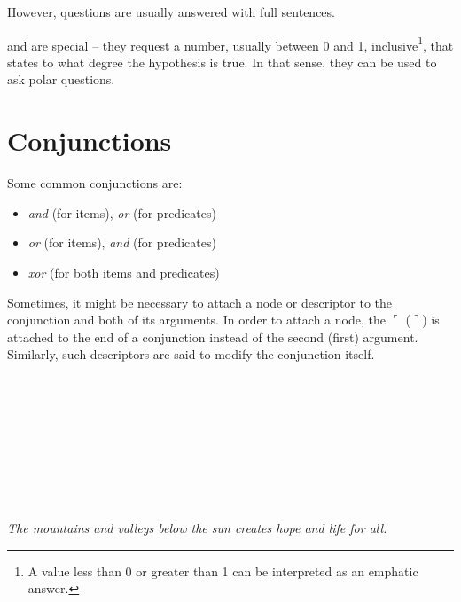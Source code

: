 \documentclass{book}
\begin{document}
However,  questions are usually answered with full sentences.

 and  are special -- they request a number, usually between 0 and 1, inclusive\footnote{A value less than 0 or greater than 1 can be interpreted as an emphatic answer.}, that states to what degree the hypothesis is true. In that sense, they can be used to ask polar questions.

\section{Conjunctions}


Some common conjunctions are:

\begin{itemize}
  \item {} \emph{and} (for items), \emph{or} (for predicates)
  \item {} \emph{or} (for items), \emph{and} (for predicates)
  \item {} \emph{xor} (for both items and predicates)
\end{itemize}

Sometimes, it might be necessary to attach a node or descriptor to the conjunction and both of its arguments. In order to attach a node, the $\ulcorner$ ($\urcorner$) is attached to the end of a conjunction instead of the second (first) argument. Similarly, such descriptors are said to modify the conjunction itself. \\
~\\
 \\
 \\
\hli{$\llcorner$}      \\
~\\
 \\
 \\
      \\
~\\
\emph{The mountains and valleys below the sun creates hope and life for all.}
\end{document}
